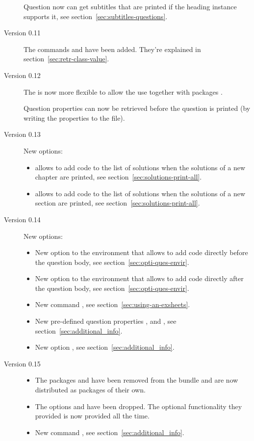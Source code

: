 \documentclass[load-preamble+,scrartcl={DIV10}]{cnltx-doc}
\begin{document}
\begin{description}
  Question now can get subtitles that are printed if the heading instance
  supports it, see section~\ref{sec:subtitles-questions}.

\item[Version 0.11]
  The commands  and  have been
  added.  They're explained in section~\ref{sec:retr-class-value}.
 
\item[Version 0.12]
  The  is now more flexible to allow the use together with
  packages .

  Question properties can now be retrieved before the question is printed (by
  writing the properties to the  file).

\item[Version 0.13]
  New options:
  \begin{itemize}
    \item {} allows to add code to the list of solutions
      when the solutions of a new chapter are printed, see
      section~\ref{sec:solutions-print-all}.
    \item {} allows to add code to the list of solutions
      when the solutions of a new section are printed, see
      section~\ref{sec:solutions-print-all}.
  \end{itemize}

\item[Version 0.14]
  New options:
  \begin{itemize}
    \item New option  to the  environment that
      allows to add code directly before the question body, see
      section~\ref{sec:opti-ques-envir}. 
    \item New option  to the  environment that
      allows to add code directly after the question body, see
      section~\ref{sec:opti-ques-envir}.
    \item New command , see
      section~\ref{sec:using-an-exsheets}.
    \item New pre-defined question properties ,
       and , see
      section~\ref{sec:additional_info}.
    \item New option , see
      section~\ref{sec:additional_info}.
  \end{itemize}

\item[Version 0.15]
  \begin{itemize}
    \item The packages  and  have been removed from
      the bundle and are now distributed as packages of their own.
     \item The options  and  have
       been dropped.  The optional functionality they provided is now provided
       all the time.
    \item New command , see
      section~\ref{sec:additional_info}.
  \end{itemize}


\end{description}
\end{document}
